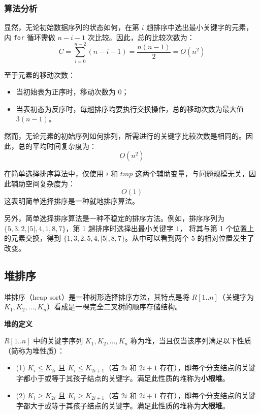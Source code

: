 \documentclass[lang=cn,newtx,10pt,scheme=chinese]{elegantbook}
\begin{document}
\subsubsection{算法分析}
显然，无论初始数据序列的状态如何，在第 $i$ 趟排序中选出最小关键字的元素，内 \texttt{for} 循环需做 $n - i - 1$ 次比较。因此，总的比较次数为：
\[
C = \sum_{i=0}^{n-2} (n - i - 1) = \frac{n(n-1)}{2} = O(n^2)
\]

至于元素的移动次数：

\begin{itemize}
  \item 当初始表为正序时，移动次数为 $0$；
  \item 当表初态为反序时，每趟排序均要执行交换操作，总的移动次数为最大值 $3(n-1)$。
\end{itemize}

然而，无论元素的初始序列如何排列，所需进行的关键字比较次数是相同的。因此，总的平均时间复杂度为：
\[
O(n^2)
\]

在简单选择排序算法中，仅使用 $i$ 和 $tmp$ 这两个辅助变量，与问题规模无关，因此辅助空间复杂度为：
\[
O(1)
\]
这表明简单选择排序是一种就地排序算法。

另外，简单选择排序算法是一种不稳定的排序方法。例如，排序序列为 $\{5, 3, 2, |5|, 4, 1, 8, 7\}$，第 1 趟排序时选择出最小关键字 $1$，
将其与第 1 个位置上的元素交换，得到 $\{1, 3, 2, 5, 4, |5|, 8, 7\}$。从中可以看到两个 $5$ 的相对位置发生了改变。





\subsection{堆排序}

堆排序（heap sort）是一种树形选择排序方法，其特点是将 $R[1..n]$（关键字为 $K_1, K_2, \dots, K_n$）看成是一棵完全二叉树的顺序存储结构。


\textbf{堆的定义}  

$R[1..n]$ 中的关键字序列 $K_1, K_2, \dots, K_n$ 称为堆，当且仅当该序列满足以下性质（简称为堆性质）：
\begin{itemize}
  \item (1) $K_i \leq K_{2i}$ 且 $K_i \leq K_{2i+1}$（若 $2i$ 和 $2i+1$ 存在），即每个分支结点的关键字都小于或等于其孩子结点的关键字。满足此性质的堆称为\textbf{小根堆}。
  \item (2) $K_i \geq K_{2i}$ 且 $K_i \geq K_{2i+1}$（若 $2i$ 和 $2i+1$ 存在），即每个分支结点的关键字都大于或等于其孩子结点的关键字。满足此性质的堆称为\textbf{大根堆}。
\end{itemize}
\end{document}
